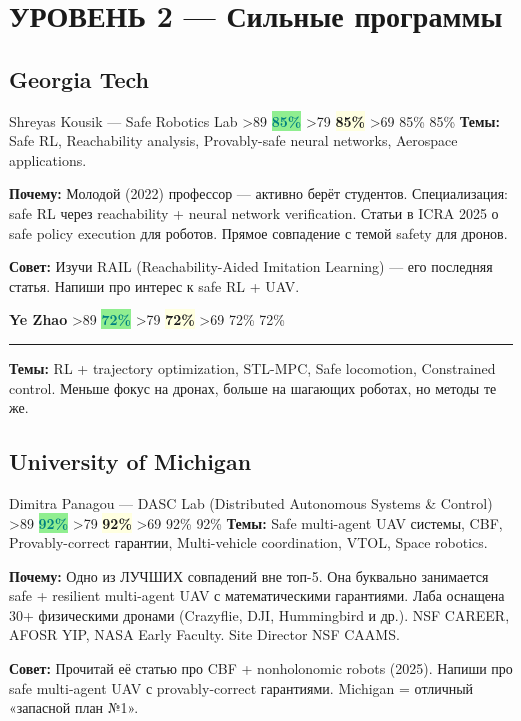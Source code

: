\documentclass[10pt, a4paper]{article}
\newcommand{\match}[1]{%
  \ifnum#1>89 \colorbox{lightgreen}{\textcolor{teal}{\textbf{#1\%}}}%
  \else\ifnum#1>79 \colorbox{lightyellow}{\textcolor{amber}{\textbf{#1\%}}}%
  \else\ifnum#1>69 \colorbox{lightorange}{\textcolor{amber}{#1\%}}%
  \else \colorbox{lightred}{\textcolor{red!70!black}{#1\%}}%
  \fi\fi\fi}
\newcommand{\profsec}[3]{%
  \vspace{4pt}
  {\bfseries\color{navy}#1}\quad{\small\color{midgray}#2}\hfill\match{#3}\\[-2pt]
  {\color{steelblue}\rule{\linewidth}{0.3pt}}
}
\begin{document}
\section{УРОВЕНЬ 2 — Сильные программы}

\subsection{Georgia Tech}

\begin{gembox}{Shreyas Kousik — Safe Robotics Lab \hfill \match{85}}
\textbf{Темы:} Safe RL, Reachability analysis, Provably-safe neural networks, Aerospace applications.

\textbf{Почему:} Молодой (2022) профессор — активно берёт студентов. Специализация: safe RL через reachability + neural network verification. Статьи в ICRA 2025 о safe policy execution для роботов. Прямое совпадение с темой safety для дронов.

\textbf{Совет:} Изучи RAIL (Reachability-Aided Imitation Learning) — его последняя статья. Напиши про интерес к safe RL + UAV.
\end{gembox}

\profsec{Ye Zhao}{LIDAR Lab}{72}
\textbf{Темы:} RL + trajectory optimization, STL-MPC, Safe locomotion, Constrained control. Меньше фокус на дронах, больше на шагающих роботах, но методы те же.

\subsection{University of Michigan}

\begin{gembox}{Dimitra Panagou — DASC Lab (Distributed Autonomous Systems \& Control) \hfill \match{92}}
\textbf{Темы:} Safe multi-agent UAV системы, CBF, Provably-correct гарантии, Multi-vehicle coordination, VTOL, Space robotics.

\textbf{Почему:} Одно из ЛУЧШИХ совпадений вне топ-5. Она буквально занимается safe + resilient multi-agent UAV с математическими гарантиями. Лаба оснащена 30+ физическими дронами (Crazyflie, DJI, Hummingbird и др.). NSF CAREER, AFOSR YIP, NASA Early Faculty. Site Director NSF CAAMS.

\textbf{Совет:} Прочитай её статью про CBF + nonholonomic robots (2025). Напиши про safe multi-agent UAV с provably-correct гарантиями. Michigan = отличный «запасной план №1».
\end{gembox}
\end{document}

